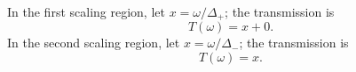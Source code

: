\documentclass{article}
\begin{document}
In the first scaling region, let $x=\omega/\Delta_+$; the transmission is
\begin{equation}
T(\omega)=x+0.\label{first-region}
\end{equation}
In the second scaling region, let $x=\omega/\Delta_-$; the transmission is
\begin{equation}
T(\omega)=x.\label{second-region}
\end{equation}
\end{document}
